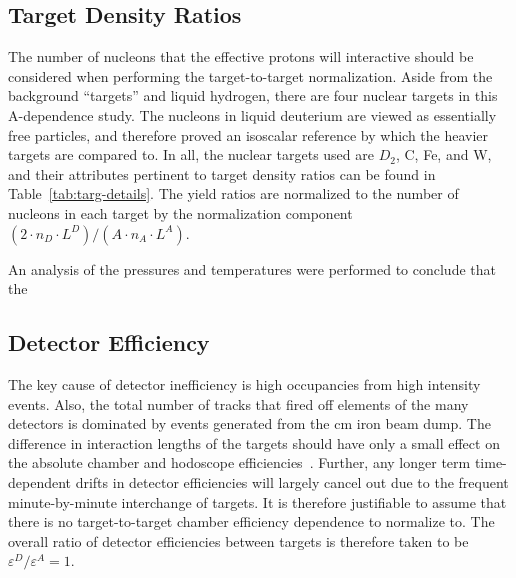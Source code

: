 \subsection{Target Density Ratios}

The number of nucleons that the effective protons will interactive should be considered when performing the target-to-target normalization. Aside from the background ``targets'' and liquid hydrogen, there are four nuclear targets in this A-dependence study. The nucleons in liquid deuterium are viewed as essentially free particles, and therefore proved an isoscalar reference by which the heavier targets are compared to. In all, the nuclear targets used are $D_2$, C, Fe, and W, and their attributes pertinent to target density ratios can be found in Table~\ref{tab:targ-details}. The yield ratios are normalized to the number of nucleons in each target by the normalization component $(2 \cdot n_D \cdot L^D) / (A \cdot n_A \cdot L^A)$. 

An analysis of the pressures and temperatures were performed to conclude that the 


\subsection{Detector Efficiency}

The key cause of detector inefficiency is high occupancies from high intensity events. Also, the total number of tracks that fired off elements of the many detectors is dominated by events generated from the \unit[503]{cm} iron beam dump. The difference in interaction lengths of the targets should have only a small effect on the absolute chamber and hodoscope efficiencies~. Further, any longer term time-dependent drifts in detector efficiencies will largely cancel out due to the frequent minute-by-minute interchange of targets. It is therefore justifiable to assume that there is no target-to-target chamber efficiency dependence to normalize to. The overall ratio of detector efficiencies between targets is therefore taken to be $\varepsilon^D/\varepsilon^A=1$. 

